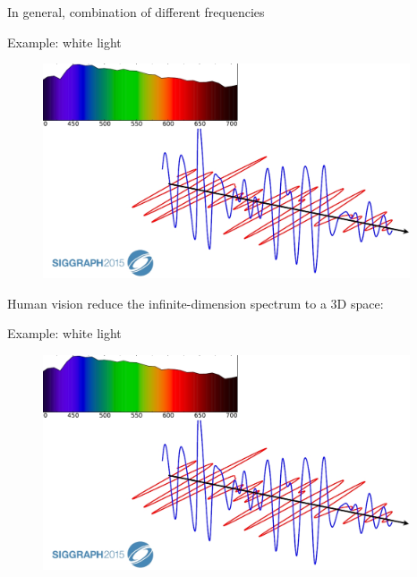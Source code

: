 \documentclass[]{beamer}
\begin{document}


 \begin{frame}


    \textcolor{mypink1}{In general, combination of different frequencies}
    \pause

    Example: white light

    \begin{figure}[h!]
      \begin{center}
        \includegraphics[height=2.5in]{images/2.jpg}
      \end{center}
    \end{figure}
  \end{frame}
    
 \begin{frame}


    \textcolor{mypink1}{Human vision reduce the infinite-dimension spectrum to a 3D space:}
    \pause

\vspace{5mm}
    Example: white light
    
    \begin{figure}[h!]
      \begin{center}
        \includegraphics[height=2.5in]{images/2.jpg}
      \end{center}
    \end{figure}
  \end{frame}
    
\end{document}
